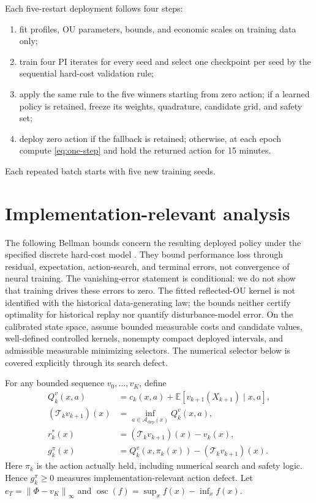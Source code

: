 \documentclass[preprint,11pt]{elsarticle}
\newcommand{\E}{\mathbb{E}}
\newcommand{\cA}{\mathcal{A}}
\newcommand{\cT}{\mathcal{T}}
\newcommand{\osc}{\operatorname{osc}}
\newcommand{\norm}[1]{\left\lVert #1\right\rVert}
\theoremstyle{plain}
\theoremstyle{remark}
\begin{document}
Each five-restart deployment follows four steps:
\begin{enumerate}[label=\arabic*.,leftmargin=2em,itemsep=1pt,topsep=3pt]
 \item fit profiles, OU parameters, bounds, and economic scales on training
 data only;
 \item train four PI iterates for every seed and select one checkpoint per seed
 by the sequential hard-cost validation rule;
 \item apply the same rule to the five winners starting from zero action; if a
 learned policy is retained, freeze its weights, quadrature, candidate grid,
 and safety set;
 \item deploy zero action if the fallback is retained; otherwise, at each
 epoch compute \eqref{eq:one-step} and hold the returned action for 15 minutes.
\end{enumerate}
Each repeated batch starts with five new training seeds.

\section{Implementation-relevant analysis}\label{sec:theory}

The following Bellman bounds concern the resulting deployed policy under the
specified discrete hard-cost model \citep{Bertsekas2019}. They bound performance
loss through residual, expectation, action-search, and terminal errors, not
convergence of neural training. The vanishing-error statement is conditional:
we do not show that training drives these errors to zero. The fitted
reflected-OU kernel is not identified with the historical data-generating law;
the bounds neither certify optimality for historical replay nor quantify
disturbance-model error.
On the calibrated state space, assume bounded measurable costs and candidate
values, well-defined controlled kernels, nonempty compact deployed intervals,
and admissible measurable minimizing selectors. The numerical selector below
is covered explicitly through its search defect.

For any bounded sequence $v_0,\ldots,v_K$, define
\begin{align}
 Q^v_k(x,a)&=c_k(x,a)+\E[v_{k+1}(X_{k+1})\mid x,a],\\
 (\cT_kv_{k+1})(x)&=\inf_{a\in\cA_{\mathrm{dep}}(x)}Q^v_k(x,a),\\
 r_k^*(x)&=(\cT_kv_{k+1})(x)-v_k(x),\\
 g_k^\pi(x)&=Q^v_k(x,\pi_k(x))-(\cT_kv_{k+1})(x).
 \label{eq:audit-terms}
\end{align}
Here $\pi_k$ is the action actually held, including numerical search and safety
logic. Hence $g_k^\pi\geq0$ measures implementation-relevant action defect.
Let $e_T=\norm{\Phi-v_K}_\infty$ and
$\osc(f)=\sup_x f(x)-\inf_x f(x)$.
\end{document}

